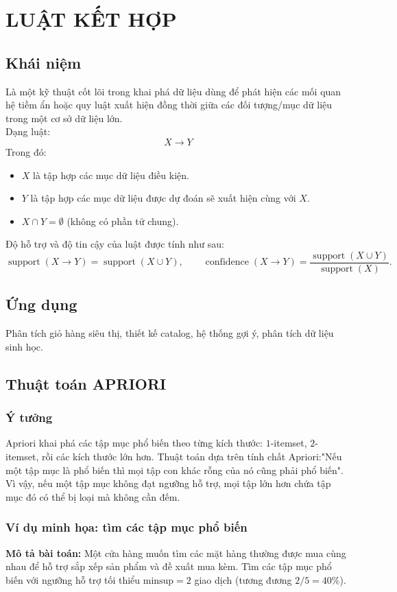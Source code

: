 \section{LUẬT KẾT HỢP}

\subsection{Khái niệm}
Là một kỹ thuật cốt lõi trong khai phá dữ liệu dùng để phát hiện các mối quan hệ tiềm ẩn hoặc quy luật xuất hiện đồng thời giữa các đối tượng/mục dữ liệu trong một cơ sở dữ liệu lớn.\\
Dạng luật:
$$ X \rightarrow Y $$
Trong đó:
\begin{itemize}
    \item $X$ là tập hợp các mục dữ liệu điều kiện.
    \item $Y$ là tập hợp các mục dữ liệu được dự đoán sẽ xuất hiện cùng với $X$.
    \item $X \cap Y = \emptyset$ (không có phần tử chung).
\end{itemize}
Độ hỗ trợ và độ tin cậy của luật được tính như sau:
\[
\operatorname{support}(X\rightarrow Y)
=\operatorname{support}(X\cup Y),\qquad
\operatorname{confidence}(X\rightarrow Y)
=\frac{\operatorname{support}(X\cup Y)}{\operatorname{support}(X)}.
\]

\subsection{Ứng dụng}
Phân tích giỏ hàng siêu thị, thiết kế catalog, hệ thống gợi ý, phân tích dữ liệu sinh học.

\subsection{Thuật toán APRIORI}
\subsubsection{Ý tưởng}
Apriori khai phá các tập mục phổ biến theo từng kích thước: $1$-itemset, $2$-itemset, rồi các kích thước lớn hơn. Thuật toán dựa trên tính chất Apriori:"Nếu một tập mục là phổ biến thì mọi tập con khác rỗng của nó cũng phải phổ biến". Vì vậy, nếu một tập mục không đạt ngưỡng hỗ trợ, mọi tập lớn hơn chứa tập mục đó có thể bị loại mà không cần đếm.

\subsubsection{Ví dụ minh họa: tìm các tập mục phổ biến}
\textbf{Mô tả bài toán:} Một cửa hàng muốn tìm các mặt hàng thường được mua cùng nhau để hỗ trợ sắp xếp sản phẩm và đề xuất mua kèm. Tìm các tập mục phổ biến với ngưỡng hỗ trợ tối thiểu $\text{minsup}=2$ giao dịch (tương đương $2/5=40\%$).

